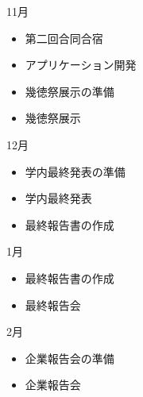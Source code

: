 11月
\begin{itemize}
\item 第二回合同合宿
\item アプリケーション開発
\item 幾徳祭展示の準備
\item 幾徳祭展示
\end{itemize}
12月
\begin{itemize}
\item 学内最終発表の準備
\item 学内最終発表
\item 最終報告書の作成
\end{itemize}
1月
\begin{itemize}
\item 最終報告書の作成
\item 最終報告会
\end{itemize}
2月
\begin{itemize}
\item 企業報告会の準備
\item 企業報告会
\end{itemize}



